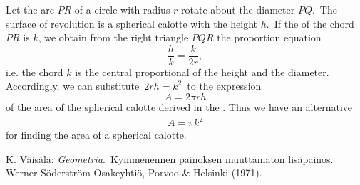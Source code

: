 \documentclass[12pt]{article}
\theoremstyle{definition}
\begin{document}
Let the arc $PR$ of a circle with radius $r$ rotate about the diameter $PQ$.\, The surface of revolution is a spherical calotte with the height $h$.\, If the  of the chord $PR$ is $k$, we obtain from the right triangle $PQR$ the proportion equation
$$\frac{h}{k} = \frac{k}{2r},$$
i.e. the chord $k$ is the central proportional of the height and the diameter.\, Accordingly, we can substitute\, $2rh = k^2$\, to the expression
$$A = 2\pi rh$$
of the area of the spherical calotte derived in the . Thus we have an alternative  
\begin{align}
A = \pi{k}^2
\end{align}
for finding the area of a spherical calotte.

\begin{thebibliography}{9}
 {\sc K. V\"ais\"al\"a}: {\em Geometria}.\, Kymmenennen painoksen muuttamaton lis\"apainos.\, Werner S\"oderstr\"om Osakeyhti\"o, Porvoo \& Helsinki (1971).

\end{thebibliography}
\end{document}
